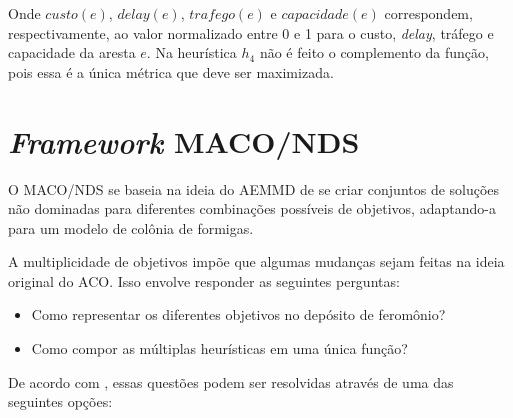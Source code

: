 Onde $custo(e)$, $delay(e)$, $trafego(e)$ e $capacidade(e)$ correspondem, respectivamente, ao valor normalizado entre 0 e 1 para o custo, \textit{delay}, tráfego e capacidade da aresta $e$. Na heurística $h_4$ não é feito o complemento da função, pois essa é a única métrica que deve ser maximizada.

\section{\textit{Framework} MACO/NDS}
\label{section_algoritmo_framework}

O MACO/NDS se baseia na ideia do AEMMD de se criar conjuntos de soluções não dominadas para diferentes combinações possíveis de objetivos, adaptando-a para um modelo de colônia de formigas.

A multiplicidade de objetivos impõe que algumas mudanças sejam feitas na ideia original do ACO. Isso envolve responder as seguintes perguntas:

\begin{itemize}
	\item Como representar os diferentes objetivos no depósito de feromônio?
	\item Como compor as múltiplas heurísticas em uma única função?
\end{itemize}

De acordo com \cite{Alaya2007}, essas questões podem ser resolvidas através de uma das seguintes opções:

